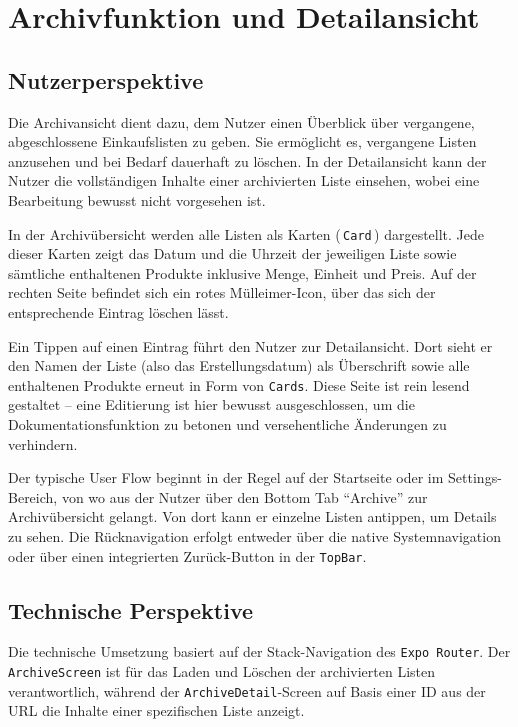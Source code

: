 \chapter{Archivfunktion und Detailansicht}
\renewcommand{\authorinitials}{FK}

\section{Nutzerperspektive}

Die Archivansicht dient dazu, dem Nutzer einen Überblick über vergangene, abgeschlossene Einkaufslisten zu geben. Sie ermöglicht es, vergangene Listen anzusehen und bei Bedarf dauerhaft zu löschen. In der Detailansicht kann der Nutzer die vollständigen Inhalte einer archivierten Liste einsehen, wobei eine Bearbeitung bewusst nicht vorgesehen ist.

In der Archivübersicht werden alle Listen als Karten (\,\texttt{Card}\,) dargestellt. Jede dieser Karten zeigt das Datum und die Uhrzeit der jeweiligen Liste sowie sämtliche enthaltenen Produkte inklusive Menge, Einheit und Preis. Auf der rechten Seite befindet sich ein rotes Mülleimer-Icon, über das sich der entsprechende Eintrag löschen lässt.

Ein Tippen auf einen Eintrag führt den Nutzer zur Detailansicht. Dort sieht er den Namen der Liste (also das Erstellungsdatum) als Überschrift sowie alle enthaltenen Produkte erneut in Form von \texttt{Cards}. Diese Seite ist rein lesend gestaltet – eine Editierung ist hier bewusst ausgeschlossen, um die Dokumentationsfunktion zu betonen und versehentliche Änderungen zu verhindern.

Der typische User Flow beginnt in der Regel auf der Startseite oder im Settings-Bereich, von wo aus der Nutzer über den Bottom Tab \enquote{Archive} zur Archivübersicht gelangt. Von dort kann er einzelne Listen antippen, um Details zu sehen. Die Rücknavigation erfolgt entweder über die native Systemnavigation oder über einen integrierten Zurück-Button in der \texttt{TopBar}.

\section{Technische Perspektive}

Die technische Umsetzung basiert auf der Stack-Navigation des \texttt{Expo Router}. Der \texttt{ArchiveScreen} ist für das Laden und Löschen der archivierten Listen verantwortlich, während der \texttt{ArchiveDetail}-Screen auf Basis einer ID aus der URL die Inhalte einer spezifischen Liste anzeigt.

